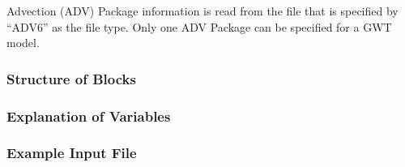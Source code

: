 Advection (ADV) Package information is read from the file that is specified by ``ADV6'' as the file type.  Only one ADV Package can be specified for a GWT model. 

\vspace{5mm}
\subsubsection{Structure of Blocks}


\vspace{5mm}
\subsubsection{Explanation of Variables}
\begin{description}

\end{description}

\vspace{5mm}
\subsubsection{Example Input File}


